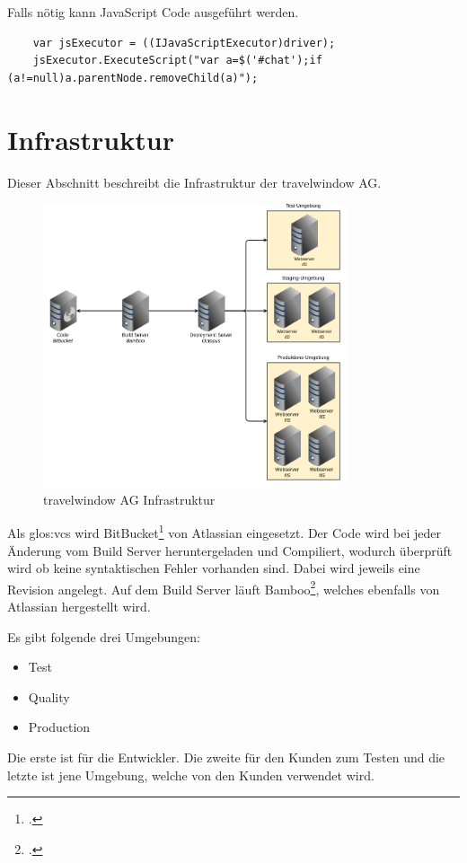 Falls nötig kann JavaScript Code ausgeführt werden.

\begin{lstlisting}
	var jsExecutor = ((IJavaScriptExecutor)driver);
	jsExecutor.ExecuteScript("var a=$('#chat');if (a!=null)a.parentNode.removeChild(a)");
\end{lstlisting}


\section{Infrastruktur}
\label{sec:umsetzung:infrastruktur}
Dieser Abschnitt beschreibt die Infrastruktur der travelwindow AG.

\begin{figure}[H]
	\centering
	\includegraphics[width=0.8\textwidth]{images/trv infrastructure.png}
	\caption{travelwindow AG Infrastruktur}
	\label{fig:umsetzung:infrastruktur}
\end{figure}

Als \Gls{glos:vcs} wird BitBucket\footcite{Git_and_Mercurial_code_management_for_teams_2015-07-26} von Atlassian eingesetzt. Der Code wird bei jeder Änderung vom Build Server heruntergeladen und Compiliert, wodurch überprüft wird ob keine syntaktischen Fehler vorhanden sind. Dabei wird jeweils eine Revision angelegt. Auf dem Build Server läuft Bamboo\footcite{Bamboo_2015-07-26}, welches ebenfalls von Atlassian hergestellt wird. 

Es gibt folgende drei Umgebungen:
\begin{itemize}
\item Test
\item Quality
\item Production
\end{itemize}
Die erste ist für die Entwickler. Die zweite für den Kunden zum Testen und die letzte ist jene Umgebung, welche von den Kunden verwendet wird.


